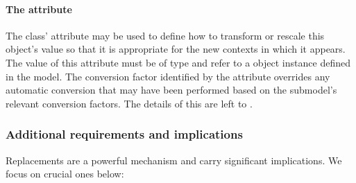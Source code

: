 \paragraph{The \fixttspace{} attribute}
\label{replacedby-conversionfactor}

The \ReplacedBy class'  attribute may be used to
define how to transform or rescale this object's value so that it is
appropriate for the new contexts in which it appears.  The value of this
attribute must be of type  and refer to a
\Parameter object instance defined in the model.  The conversion factor
identified by the  attribute overrides any
automatic conversion that may have been performed based on the
submodel's relevant conversion factors.  The details of this are left to
.


\subsubsection{Additional requirements and implications}
\label{replacedelement-additional}

Replacements are a powerful mechanism and carry significant
implications.  We focus on crucial ones below:

